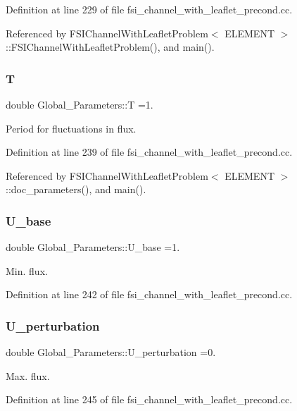 Definition at line 229 of file fsi\+\_\+channel\+\_\+with\+\_\+leaflet\+\_\+precond.\+cc.



Referenced by F\+S\+I\+Channel\+With\+Leaflet\+Problem$<$ E\+L\+E\+M\+E\+N\+T $>$\+::\+F\+S\+I\+Channel\+With\+Leaflet\+Problem(), and main().

\mbox{\label{namespaceGlobal__Parameters_aeb964d25d190afd43c8317d4217f31b4}} 
\subsubsection{\texorpdfstring{T}{T}}
{\footnotesize\ttfamily double Global\+\_\+\+Parameters\+::T =1.}



Period for fluctuations in flux. 



Definition at line 239 of file fsi\+\_\+channel\+\_\+with\+\_\+leaflet\+\_\+precond.\+cc.



Referenced by F\+S\+I\+Channel\+With\+Leaflet\+Problem$<$ E\+L\+E\+M\+E\+N\+T $>$\+::doc\+\_\+parameters(), and main().

\mbox{\label{namespaceGlobal__Parameters_a6c27745997f9e118f0a99bf0390dbf4b}} 
\subsubsection{\texorpdfstring{U\+\_\+base}{U\_base}}
{\footnotesize\ttfamily double Global\+\_\+\+Parameters\+::\+U\+\_\+base =1.}



Min. flux. 



Definition at line 242 of file fsi\+\_\+channel\+\_\+with\+\_\+leaflet\+\_\+precond.\+cc.

\mbox{\label{namespaceGlobal__Parameters_ac04d493b5af4d1c99a9574489cf4dda0}} 
\subsubsection{\texorpdfstring{U\+\_\+perturbation}{U\_perturbation}}
{\footnotesize\ttfamily double Global\+\_\+\+Parameters\+::\+U\+\_\+perturbation =0.}



Max. flux. 



Definition at line 245 of file fsi\+\_\+channel\+\_\+with\+\_\+leaflet\+\_\+precond.\+cc.

